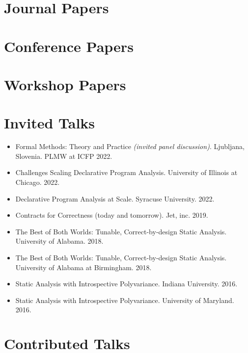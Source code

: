 \documentclass[line]{res}
\begin{document}
\begin{resume}
\section{\large Journal Papers} \vspace{0.3cm}

\vspace{-0.4cm}

\section{\large Conference Papers} \vspace{0.3cm}

\vspace{-0.4cm}

\section{\large Workshop Papers} \vspace{0.3cm}

\vspace{-0.4cm}

\section{\large Invited Talks} \vspace{0.2in}
\begin{itemize}
\item Formal Methods: Theory and Practice \textit{(invited panel discussion)}. Ljubljana, Slovenia. PLMW at ICFP 2022.
\item Challenges Scaling Declarative Program Analysis. University of Illinois at Chicago. 2022.
\item Declarative Program Analysis at Scale. Syracuse University. 2022.
\item Contracts for Correctness (today and tomorrow). Jet, inc. 2019.
\item The Best of Both Worlds: Tunable, Correct-by-design Static Analysis. University of Alabama. 2018.
\item The Best of Both Worlds: Tunable, Correct-by-design Static Analysis. University of Alabama at Birmingham. 2018.
\item Static Analysis with Introspective Polyvariance. Indiana University. 2016.
\item Static Analysis with Introspective Polyvariance. University of Maryland. 2016.
\end{itemize}

\section{\large Contributed Talks} \vspace{0.2in}



\end{resume}

\end{document}
